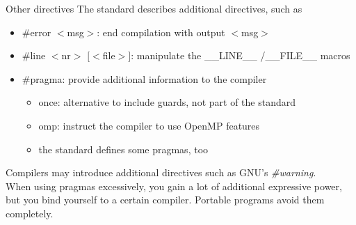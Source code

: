 \begin{frame}{Other directives}
	The standard describes additional directives, such as
	\begin{itemize}
		\item \#error $<$msg$>$: end compilation with output $<$msg$>$
		\item \#line $<$nr$>$ $[<$file$>]$: manipulate the \_\_LINE\_\_ /\_\_FILE\_\_ macros
		\item \#pragma: provide additional information to the compiler
		\begin{itemize}
			\item once: alternative to include guards, not part of the standard
			\item omp: instruct the compiler to  use OpenMP features
			\item the standard defines some pragmas, too
		\end{itemize}
	\end{itemize}
	Compilers may introduce additional directives such as GNU's \textit{\#warning}.\\
	\bigskip
	When using pragmas excessively, you gain a lot of additional expressive power, but you
	bind yourself to a certain compiler. Portable programs avoid them completely.
\end{frame}


